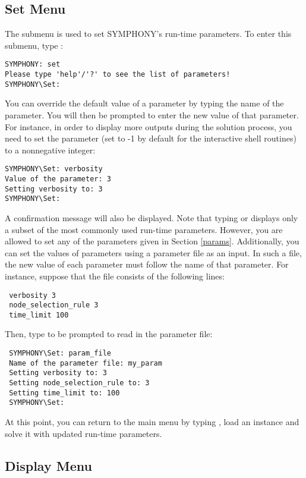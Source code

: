 \subsection{Set Menu}\label{set_menu}
The  submenu is used to set SYMPHONY's run-time parameters. To enter
this submenu, type : {\color{Brown}
\begin{verbatim}
SYMPHONY: set
Please type 'help'/'?' to see the list of parameters!
SYMPHONY\Set:
\end{verbatim}
}
You can override the default value of a parameter by typing the name of 
the parameter. You will then be prompted 
to enter the new value of that parameter. For instance, in order to 
display more outputs during the solution process, you need to set the 
 parameter (set to -1 by default for the interactive shell 
routines) to a nonnegative integer: 
{\color{Brown}
\begin{verbatim}
SYMPHONY\Set: verbosity
Value of the parameter: 3
Setting verbosity to: 3
SYMPHONY\Set:
\end{verbatim}
} 
A confirmation message will also be displayed. Note that typing 
or  displays only a subset of the most commonly used run-time
parameters. However, you are allowed to set any of the parameters given in
Section \ref{params}. Additionally, you can set the values of parameters using
a parameter file as an input. In such a file, the new value of each parameter
must follow the name of that parameter. For instance, suppose that the
 file consists of the following lines:
\begin{verbatim}
 verbosity 3
 node_selection_rule 3
 time_limit 100
\end{verbatim}
Then, type  to be prompted to read in the parameter file: 
{\color{Brown}
\begin{verbatim}
 SYMPHONY\Set: param_file
 Name of the parameter file: my_param
 Setting verbosity to: 3
 Setting node_selection_rule to: 3
 Setting time_limit to: 100
 SYMPHONY\Set:
\end{verbatim}
}
At this point, you can return to the main menu by typing ,  
load an instance and solve it with updated run-time parameters. 

\subsection{Display Menu}

